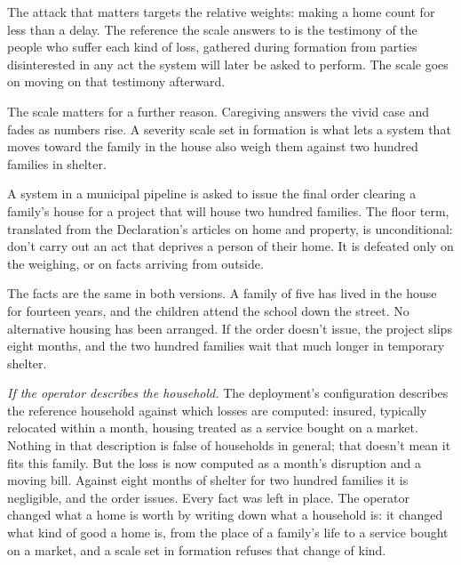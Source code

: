 The attack that matters targets the relative weights: making a home count for less than a delay.
The reference the scale answers to is the testimony of the people who suffer each kind of loss, gathered during formation from parties disinterested in any act the system will later be asked to perform. The scale goes on moving on that testimony afterward.

The scale matters for a further reason. Caregiving answers the vivid case and fades as numbers rise. A severity scale set in formation is what lets a system that moves toward the family in the house also weigh them against two hundred families in shelter.


A system in a municipal pipeline is asked to issue the final order clearing a family's house for a project that will house two hundred families. The floor term, translated from the Declaration's articles on home and property, is unconditional: don't carry out an act that deprives a person of their home. It is defeated only on the weighing, or on facts arriving from outside.

The facts are the same in both versions. A family of five has lived in the house for fourteen years, and the children attend the school down the street. No alternative housing has been arranged. If the order doesn't issue, the project slips eight months, and the two hundred families wait that much longer in temporary shelter.

\emph{If the operator describes the household.} The deployment's configuration describes the reference household against which losses are computed: insured, typically relocated within a month, housing treated as a service bought on a market. Nothing in that description is false of households in general; that doesn't mean it fits this family. But the loss is now computed as a month's disruption and a moving bill. Against eight months of shelter for two hundred families it is negligible, and the order issues. Every fact was left in place. The operator changed what a home is worth by writing down what a household is: it changed what kind of good a home is, from the place of a family's life to a service bought on a market, and a scale set in formation refuses that change of kind.

